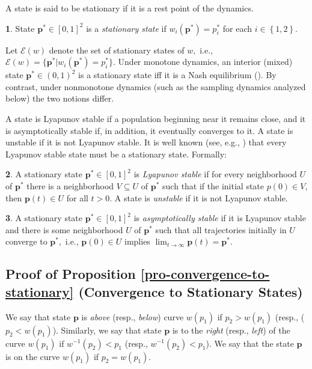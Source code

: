\documentclass[12pt]{article}
\numberwithin{equation}{section}
\numberwithin{figure}{section}
\theoremstyle{definition}
\newtheorem{defn}{\protect\definitionname}
\theoremstyle{plain}
\theoremstyle{plain}
\theoremstyle{plain}
\theoremstyle{remark}
\theoremstyle{plain}
\theoremstyle{plain}
\providecommand{\definitionname}{Definition}
\begin{document}
A state is said to be 
stationary if
it is a rest point of the dynamics.
\begin{defn}
\label{def:equilbirium}State $\mathbf{p}^{*}\in\left[0,1\right]^{2}$
is a \emph{stationary state}
if $w_{i}\left(\mathbf{p}^{*}\right)=p_{i}^{*}$
for each $i\in\left\{ 1,2\right\}$.
\end{defn}
Let $\mathcal{E}\left(w\right)$ denote the set of stationary states of $w,$ i.e., $\mathcal{E}\left(w\right) = \{\mathbf{p}^{*} | w_{i}\left(\mathbf{p}^{*}\right)=p_{i}^{*}\}.$ Under monotone dynamics,  an interior (mixed) state $\mathbf{p}^*\in (0,1)^2$ is a stationary state iff it is a Nash equilibrium (\citealp[Prop. 4.7]{weibull1997evolutionary}). By contrast, under nonmonotone dynamics (such as the sampling dynamics analyzed below) the two notions differ.

A state is Lyapunov stable if a population beginning near it remains close, and it is asymptotically stable if, in addition, it eventually converges to it. A state is
unstable if it is not Lyapunov stable. It is well known (see, e.g., \citealp[Section 6.4]{weibull1997evolutionary})
that every Lyapunov stable state must be a stationary state. Formally:

\begin{defn}
\label{def:lyaponouv-stability} A stationary state $\mathbf{p}^{*}\in\left[0,1\right]^{2}$
is \emph{Lyapunov stable} if for every neighborhood $U$ of $\mathbf{p}^{*}$
there is a neighborhood $V\subseteq U$ of $\mathbf{p}^{*}$ such that if the
initial state $p\left(0\right)\in V$, then $\mathbf{p}\left(t\right)\in U$
for all $t>0$. A state is \emph{unstable} if it is not
Lyapunov stable.
\end{defn}

\begin{defn}
A stationary state $\mathbf{p}^{*}\in\left[0,1\right]^{2}$
is \emph{asymptotically stable} if it is Lyapunov stable and there is some neighborhood $U$
of $\mathbf{p}^{*}$ such that all trajectories initially in $U$ converge
to $\mathbf{p}^{*},$ i.e., $\mathbf{p}\left(0\right)\in U$ implies $\lim_{t\rightarrow\infty}\mathbf{p}\left(t\right)=\mathbf{p}^{*}$.
\end{defn}


\subsection{Proof of Proposition \ref{pro-convergence-to-stationary} (Convergence to Stationary States) %
}\label{proof-convergence-to-stationary}
We say that state $\textbf{p}$ is \emph{above} (resp., \emph{below}) curve $w(p_1)$ if $p_2>w(p_1)$ (resp., ($p_2<w(p_1)$). Similarly, we say that state $\textbf{p}$ is to the \emph{right} (resp., \emph{left})  of the curve $w(p_1)$ if $w^{-1}(p_2)<p_1$ (resp., $w^{-1}(p_2)<p_1$). We say that the state $\textbf{p}$ is on the curve $w(p_1)$ if $p_2=w(p_1).$
\end{document}
